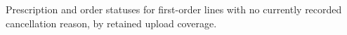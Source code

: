 Prescription and order statuses for first-order lines with no currently recorded cancellation reason, by retained upload coverage.
